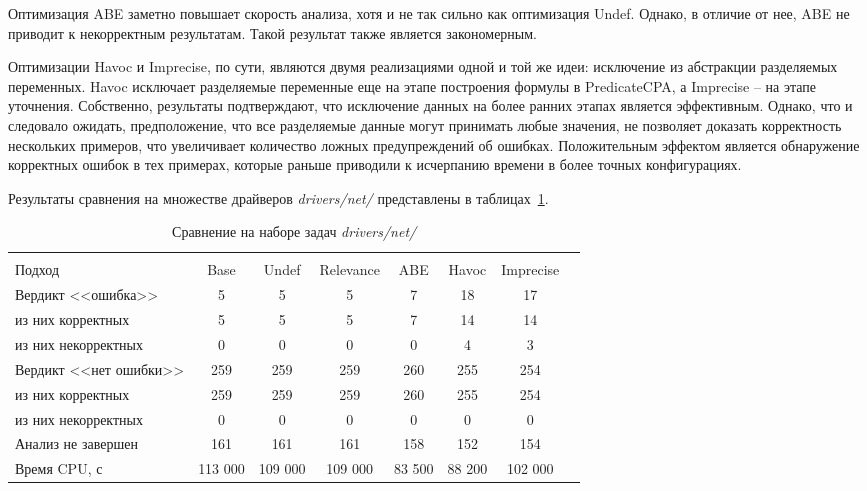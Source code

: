 Оптимизация ABE заметно повышает скорость анализа, хотя и не так сильно как оптимизация Undef. Однако, в отличие от нее, ABE не приводит к некорректным результатам. 
Такой результат также является закономерным.

Оптимизации Havoc и Imprecise, по сути, являются двумя реализациями одной и той же идеи: исключение из абстракции разделяемых переменных.
Havoc исключает разделяемые переменные еще на этапе построения формулы в PredicateCPA, а Imprecise -- на этапе уточнения.
Собственно, результаты подтверждают, что исключение данных на более ранних этапах является эффективным.
Однако, что и следовало ожидать, предположение, что все разделяемые данные могут принимать любые значения, не позволяет доказать корректность нескольких примеров, что увеличивает количество ложных предупреждений об ошибках.
Положительным эффектом является обнаружение корректных ошибок в тех примерах, которые раньше приводили к исчерпанию времени в более точных конфигурациях.

Результаты сравнения на множестве драйверов \textit{drivers/net/} представлены в таблицах~\ref{table-drivers-opt}.

  \begin{table}[h]\footnotesize \centering
    \caption{Сравнение на наборе задач \textit{drivers/net/}}
  	\label{table-drivers-opt}
    \begin{tabular}{ | l | c | c | c | c | c | c | c |}
      \hline
      		& 		\multicolumn{6}{c|}{\theoryraces}  \\
      Подход         				& Base 		& Undef		& Relevance & ABE 		& Havoc   	& Imprecise	\\ \hline
      Вердикт <<ошибка>> 				& 5  		& 5   		& 5       	& 7   		& 18     	& 17		\\ 
  \hspace{0.5cm} из них корректных 	& 5 		& 5 		& 5     	& 7   		& 14     	& 14 		\\ 
  \hspace{0.5cm} из них некорректных & 0 		& 0 		& 0     	& 0  		& 4      	& 3 		\\ \hline
      Вердикт <<нет ошибки>>  		& 259    	& 259    	& 259     	& 260   	& 255    	& 254		\\ 
  \hspace{0.5cm} из них корректных 	& 259 		& 259    	& 259       & 260   	& 255    	& 254    	\\
  \hspace{0.5cm} из них некорректных & 0 		& 0    		& 0      	& 0   		& 0     	& 0     	\\ \hline
      Анализ не завершен       		& 161    	& 161    	& 161     	& 158   	& 152    	& 154    	\\ \hline
      Время CPU, с   				& 113 000 	& 109 000 	& 109 000  	& 83 500   	& 88 200    & 102 000   \\ 
      \hline
    \end{tabular}
  \end{table}

